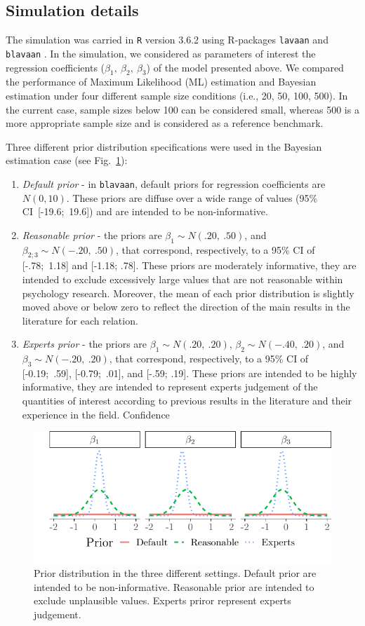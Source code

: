 \documentclass[graybox]{svmult}
\begin{document}
\subsection{Simulation details}

The simulation was carried in \texttt{R} version 3.6.2 \cite{rcoreteamLanguageEnvironmentStatistical2018} using R-packages \texttt{lavaan} \cite{rosseelLavaanPackageStructural2012} and \texttt{blavaan} \cite{merkleBlavaanBayesianStructural2018}. In the simulation, we  considered as parameters of interest the regression coefficients ($\beta_1,\ \beta_2,\ \beta_3$) of the model presented above. We compared the performance of Maximum Likelihood (ML) estimation and Bayesian estimation under four different sample size conditions (i.e., 20, 50, 100, 500). In the current case, sample sizes below 100 can be considered small, whereas 500 is a more appropriate sample size and is considered as a reference benchmark.

Three different prior distribution specifications were used in the Bayesian estimation case (see Fig.~\ref{fig:prior}):
\begin{enumerate}
	\item{\textit{Default prior} -  in \texttt{blavaan}, default priors for regression coefficients are $N(0,10)$}. These priors are diffuse over a wide range of values (95\% CI\ [-19.6;\ 19.6]) and are intended to be non-informative.
	\item{\textit{Reasonable prior} - the priors are $\beta_1\sim N(.20,\ .50)$, and  $\beta_{2;3}\sim N(-.20,\ .50)$, that correspond, respectively, to a 95\% CI of  [-.78;\ 1.18] and  [-1.18; .78]. These priors are moderately informative, they are intended to exclude excessively large values that are not reasonable within psychology research. Moreover, the mean of each prior distribution is slightly moved above or below zero to reflect the direction of the main results in the literature for each relation.}
 	\item{\textit{Experts prior} - the priors are $\beta_1\sim N(.20,\ .20)$,  $\beta_{2}\sim N(-.40,\ .20)$}, and $\beta_3\sim N(-.20,\ .20)$, that correspond, respectively, to a 95\% CI of  [-0.19;\ .59], [-0.79;\ .01], and  [-.59; .19]. These priors are intended to be highly informative, they are intended to represent experts judgement of the quantities of interest according to previous results in the literature and their experience in the field. Confidence 
\end{enumerate}
\begin{figure}[b]
	\sidecaption
	\includegraphics[width = .60\textwidth]{figure/Plot_prior}
	\caption{Prior distribution in the three different settings. Default prior are intended to be non-informative. Reasonable prior  are intended to exclude unplausible values. Experts priror represent experts judgement.}
	\label{fig:prior}
\end{figure}
\end{document}
